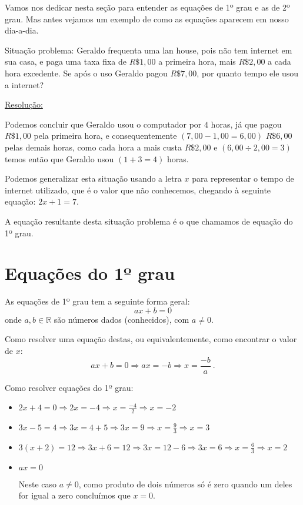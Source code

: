 Vamos nos dedicar nesta seção para entender as equações de 1º grau e as de 2º grau. Mas antes vejamos um exemplo de como as equações aparecem em nosso dia-a-dia.

\begin{exem}
 Situação problema: Geraldo frequenta uma lan house, pois não tem internet em sua casa, e paga uma taxa fixa de $R\$ 1,00$ a primeira hora, mais $R\$ 2,00$ a cada hora excedente. Se após o uso Geraldo pagou $R\$ 7,00$, por quanto tempo ele usou a internet?

 \underline{Resolução:}

 Podemos concluir que Geraldo usou o computador por $4$ horas, já que pagou $R\$ 1,00$ pela primeira hora, e consequentemente $(7,00 - 1,00 = 6,00)$ $R\$ 6,00$ pelas demais horas, como cada hora a mais custa $R\$ 2,00$ e $(6,00 \div 2,00 = 3)$ temos então que Geraldo usou $(1 + 3 = 4)$ horas.

 Podemos generalizar esta situação usando a letra $x$ para representar o tempo de internet utilizado, que é o valor que não conhecemos, chegando à seguinte equação: $2x + 1 = 7$.
\end{exem}

A equação resultante desta situação problema é o que chamamos de equação do 1º grau.

\section{Equações do 1º grau}

\colorbox{azul}{
 \begin{minipage}{0.9\linewidth}
 \begin{center}
   As equações de 1º grau tem a seguinte forma geral:
 \[ax + b = 0\]
onde $a, b \in \mathbb{R}$ são números dados (conhecidos), com $a \neq 0 $.
 \end{center}
 \end{minipage}}

 \vskip0.3cm

Como resolver uma equação destas, ou equivalentemente, como encontrar o valor de $x$:
\[ax + b = 0 \Rightarrow ax= -b \Rightarrow x = \frac{-b}{a} \ .\]


\begin{exem}
 Como resolver equações do 1º grau:
 \begin{itemize}
  \item $2x + 4 = 0 \Rightarrow 2x = -4 \Rightarrow x = \frac{-4}{2} \Rightarrow x = -2$
  \item $3x - 5 = 4 \Rightarrow 3x = 4 +5 \Rightarrow 3x = 9 \Rightarrow x = \frac{9}{3} \Rightarrow x = 3$
  \item $3(x + 2)= 12 \Rightarrow 3x + 6 = 12 \Rightarrow 3x = 12 - 6 \Rightarrow 3x = 6 \Rightarrow x = \frac{6}{3} \Rightarrow x = 2 $
  \item $ax = 0$

  Neste caso $a \neq 0$, como produto de dois números só é zero quando um deles for igual a zero concluímos que $x = 0$.
  \end{itemize}
\end{exem}

